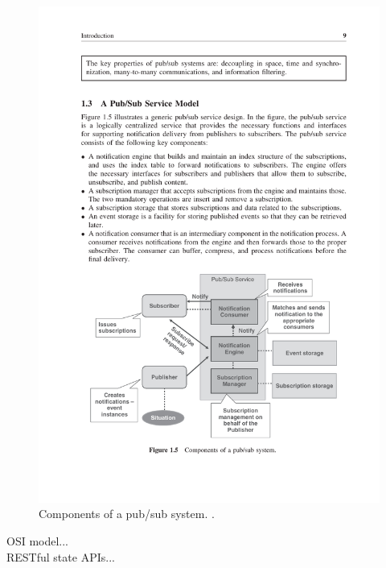 \documentclass[../report.tex]{subfiles}
\begin{document}
\begin{figure}[h!]
\centering
\includegraphics[width=0.8\linewidth]{figures/pubsubsystem.pdf}
\caption{Components of a pub/sub system. \cite[]{tarkoma2012publish}.}
\label{fig:pubsubsystem}
\end{figure}

OSI model... \\

RESTful state APIs... \\


\end{document}
